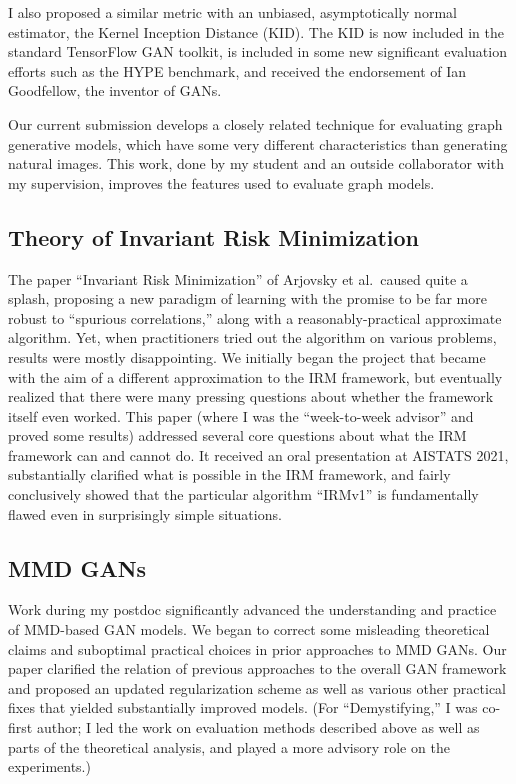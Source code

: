 \documentclass[12pt]{article}
\begin{document}
I also proposed a similar metric with an unbiased, asymptotically normal estimator, the Kernel Inception Distance (KID). The KID is now included in the standard TensorFlow GAN toolkit, is included in some new significant evaluation efforts such as the HYPE benchmark, and received the endorsement of Ian Goodfellow, the inventor of GANs.

Our current submission \cite{shirzad:contrastive-graph-eval} develops a closely related technique for evaluating graph generative models, which have some very different characteristics than generating natural images. This work, done by my student and an outside collaborator with my supervision, improves the features used to evaluate graph models.


\subsection{Theory of Invariant Risk Minimization} \label{sec:irm}
The paper ``Invariant Risk Minimization'' of Arjovsky et al.\ caused quite a splash, proposing a new paradigm of learning with the promise to be far more robust to ``spurious correlations,'' along with a reasonably-practical approximate algorithm. Yet, when practitioners tried out the algorithm on various problems, results were mostly disappointing. We initially began the project that became \cite{kamath:irm} with the aim of a different approximation to the IRM framework, but eventually realized that there were many pressing questions about whether the framework itself even worked. This paper (where I was the ``week-to-week advisor'' and proved some results) addressed several core questions about what the IRM framework can and cannot do. It received an oral presentation at AISTATS 2021, substantially clarified what is possible in the IRM framework, and fairly conclusively showed that the particular algorithm ``IRMv1'' is fundamentally flawed even in surprisingly simple situations.


\subsection{MMD GANs}

Work during my postdoc significantly advanced the understanding and practice of MMD-based GAN models. We began \cite{binkowski:mmd-gans}  to correct some misleading theoretical claims and suboptimal practical choices in prior approaches to MMD GANs. Our paper clarified the relation of previous approaches to the overall GAN framework and proposed an updated regularization scheme as well as various other practical fixes that yielded substantially improved models.
(For ``Demystifying,'' I was co-first author; I led the work on evaluation methods described above as well as parts of the theoretical analysis, and played a more advisory role on the experiments.)
\end{document}
